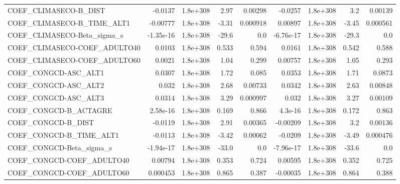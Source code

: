 \begin{tabular}{lrrrrrrrr}
COEF\_CLIMASECO-B\_DIST             &     -0.0137 &     1.8e+308 &      2.97 &  0.00298 &    -0.0257 &    1.8e+308 &          3.2 &       0.00139 \\
COEF\_CLIMASECO-B\_TIME\_ALT1        &    -0.00777 &     1.8e+308 &     -3.31 & 0.000918 &    0.00897 &    1.8e+308 &        -3.45 &      0.000561 \\
COEF\_CLIMASECO-Beta\_sigma\_s       &   -1.35e-16 &     1.8e+308 &     -29.6 &      0.0 &  -6.76e-17 &    1.8e+308 &        -29.3 &           0.0 \\
COEF\_CLIMASECO-COEF\_ADULTO40      &      0.0103 &     1.8e+308 &     0.533 &    0.594 &     0.0161 &    1.8e+308 &        0.542 &         0.588 \\
COEF\_CLIMASECO-COEF\_ADULTO60      &      0.0021 &     1.8e+308 &      1.04 &    0.299 &    0.00757 &    1.8e+308 &         1.05 &         0.293 \\
COEF\_CONGCD-ASC\_ALT1              &      0.0307 &     1.8e+308 &      1.72 &    0.085 &     0.0353 &    1.8e+308 &         1.71 &        0.0873 \\
COEF\_CONGCD-ASC\_ALT2              &       0.032 &     1.8e+308 &      2.68 &  0.00733 &     0.0342 &    1.8e+308 &         2.63 &       0.00848 \\
COEF\_CONGCD-ASC\_ALT3              &      0.0314 &     1.8e+308 &      3.29 & 0.000997 &      0.032 &    1.8e+308 &         3.27 &       0.00109 \\
COEF\_CONGCD-B\_ACTAGRE             &    2.58e-16 &     1.8e+308 &     0.169 &    0.866 &    4.3e-16 &    1.8e+308 &        0.172 &         0.863 \\
COEF\_CONGCD-B\_DIST                &     -0.0119 &     1.8e+308 &      2.91 &  0.00365 &   -0.00209 &    1.8e+308 &          3.2 &       0.00136 \\
COEF\_CONGCD-B\_TIME\_ALT1           &     -0.0113 &     1.8e+308 &     -3.42 &  0.00062 &    -0.0209 &    1.8e+308 &        -3.49 &      0.000476 \\
COEF\_CONGCD-Beta\_sigma\_s          &   -1.94e-17 &     1.8e+308 &     -33.0 &      0.0 &  -7.96e-17 &    1.8e+308 &        -33.6 &           0.0 \\
COEF\_CONGCD-COEF\_ADULTO40         &     0.00794 &     1.8e+308 &     0.353 &    0.724 &    0.00595 &    1.8e+308 &        0.352 &         0.725 \\
COEF\_CONGCD-COEF\_ADULTO60         &    0.000453 &     1.8e+308 &     0.865 &    0.387 &   -0.00035 &    1.8e+308 &        0.864 &         0.388 \\

\end{tabular}
